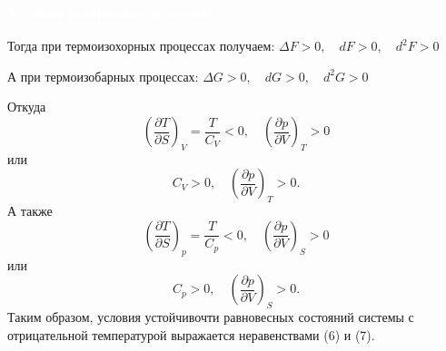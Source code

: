 \documentclass[aspectratio=169]{beamer}
\begin{document}
\begin{frame}
\frametitle{\textcolor{white}{Условия устойчивости систем}}
\vspace{0.14cm}
Тогда при термоизохорных процессах получаем:  $\Delta F > 0, \quad dF > 0, \quad d^2F > 0$


А при термоизобарных процессах:  $\Delta G > 0, \quad dG > 0, \quad d^2G > 0 $


Откуда $$\left(\frac{\partial T}{\partial S}\right)_V = \frac{T}{C_V} < 0 , \quad \left(\frac{\partial p}{\partial V}\right)_T  > 0 $$ или 
\begin{equation}
C_V > 0 ,\quad \left(\frac{\partial p}{\partial V}\right)_T  > 0 .
\end{equation}
А также $$\left(\frac{\partial T}{\partial S}\right)_p = \frac{T}{C_p} < 0 ,\quad \left(\frac{\partial p}{\partial V}\right)_S > 0 $$ или 
\begin{equation}
C_p > 0 ,\quad \left(\frac{\partial p}{\partial V}\right)_S > 0 .
\end{equation}
Таким образом, условия устойчивочти равновесных состояний системы с отрицательной температурой выражается неравенствами (6) и (7).
\end{frame}
\end{document}
